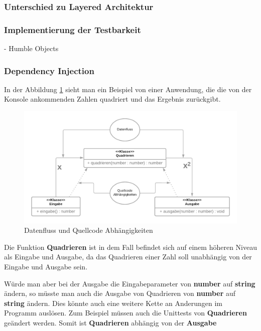 \documentclass{article}
\begin{document}
    \subsubsection{Unterschied zu Layered Architektur}
    \subsubsection{Implementierung der Testbarkeit}
    - Humble Objects
    \subsubsection{Dependency Injection}
    \label{DependencyInjection}
    In der Abbildung \ref{fig:dateflowVScodedep} sieht man ein Beispiel von einer Anwendung, die die von der Konsole ankommenden Zahlen quadriert und das Ergebnis zurückgibt.
    
    \begin{figure}[H]
        \centering
        \includegraphics[width=1\textwidth]{./images/DepInj_1.png}
        \caption{Datenfluss und Quellcode Abhängigkeiten}
        \label{fig:dateflowVScodedep}
    \end{figure}

    Die Funktion \textbf{Quadrieren} ist in dem Fall befindet sich auf einem höheren Niveau als Eingabe und Ausgabe, 
    da das Quadrieren einer Zahl soll unabhängig von der Eingabe und Ausgabe sein.

    Würde man aber bei der Ausgabe die Eingabeparameter von \textbf{number} auf \textbf{string} ändern, 
    so müsste man auch die Ausgabe von Quadrieren von \textbf{number} auf \textbf{string} ändern.
    Dies könnte auch eine weitere Kette an Anderungen im Programm auslösen. 
    Zum Beispiel müssen auch die Unittests von \textbf{Quadrieren} geändert werden.
    Somit ist \textbf{Quadrieren} abhängig von der \textbf{Ausgabe}
\end{document}
